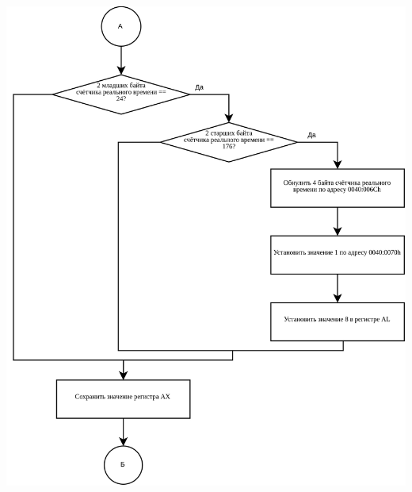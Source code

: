\documentclass[a4paper,12pt]{article}
\begin{document}
\begin{flushright}
	\includegraphics[height=0.9\textheight]{flowchart/int_8h_2.png}

\end{flushright}
\end{document}
